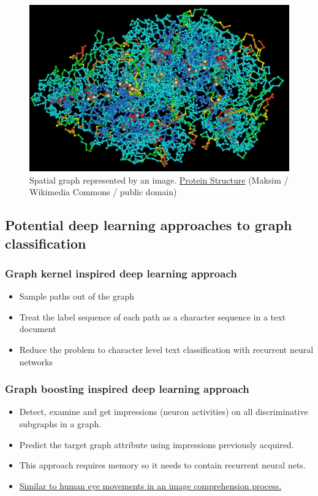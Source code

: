 \documentclass{article}
\begin{document}
\begin{landscape}
\begin{figure}[H]\centering
	\includegraphics[width=\textwidth]{ProteinStructure}
	\caption{
		Spatial graph represented by an image.
		\href{https://commons.wikimedia.org/wiki/File:ProteinStructure.jpg}
		{Protein Structure}
		(Maksim / Wikimedia Commons / public domain)
	}
	\label{fig:spatial}
\end{figure}

\pagebreak
\subsection{Potential deep learning approaches to graph classification}

\subsubsection{Graph kernel inspired deep learning approach}
\begin{itemize}
	\item Sample paths out of the graph
	\item Treat the label sequence of each path as a character sequence in a text document
	\item Reduce the problem to character level text classification with recurrent neural networks
\end{itemize}

\subsubsection{Graph boosting inspired deep learning approach}
\begin{itemize}
	\item Detect, examine and get impressions (neuron activities) on all discriminative subgraphs in a graph.
	\item Predict the target graph attribute using impressions previously acquired.
	\item This approach requires memory so it needs to contain recurrent neural nets.
	\item \href{http://blog.art21.org/2013/01/07/tracking-the-gaze/#.WG8lYN9ifRb}
	{Similar to human eye movements in an image comprehension process.}
\end{itemize}


\end{landscape}
\end{document}
